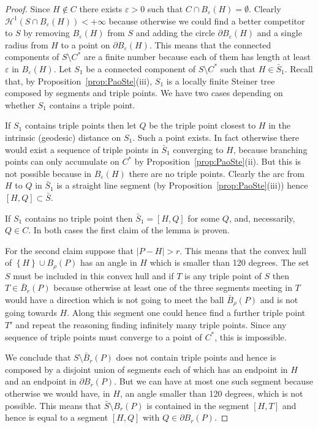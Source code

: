 \documentclass{amsart}
\renewcommand{\H}{\mathcal H}
\newcommand{\eps}{\varepsilon}
\newcommand{\abs}[1]{\left\vert #1 \right\vert}
\newcommand{\ENCLOSE}[1]{\left\{#1\right\}}
\renewcommand{\H}{\mathcal{H}}
\theoremstyle{definition}
\theoremstyle{remark}
\begin{document}
\begin{proof}
  Since $H\not \in C$ there exists $\eps>0$ such that $C\cap B_\eps(H)=\emptyset$. 
  Clearly $\H^1(S\cap B_\eps(H))<+\infty$ because otherwise we could find a better competitor
  to $S$ by removing $B_\eps(H)$ from $S$ and adding the circle $\partial B_\eps(H)$ and 
  a single radius from $H$ to a point on $\partial B_\eps(H)$.
  This means that the connected components of $S\setminus C^*$
  are a finite number because each of them has length at least $\eps$ in $B_\eps(H)$.
  Let $S_1$ be a connected component of $S\setminus C^*$ such that 
  $H\in \bar S_1$.
  Recall that, by Proposition~\ref{prop:PaoSte}(iii), $S_1$ is a locally finite Steiner tree 
  composed by segments and triple points.
  We have two cases depending on whether $S_1$ contains a triple point.
  
  If $S_1$ contains triple points
  then let $Q$ be the triple point closest to $H$
  in the intrinsic (geodesic) distance on $S_1$.
  Such a point exists. 
  In fact otherwise there would exist a sequence of 
  triple points in $\bar S_1$ converging to $H$,
  because branching points can only accumulate on $C^*$ 
  by Proposition~\ref{prop:PaoSte}(ii).
  But this is not possible because in $B_\eps(H)$ there are no triple points.
  Clearly the arc from $H$ to $Q$ in $\bar S_1$ is a straight line segment 
  (by Proposition~\ref{prop:PaoSte}(iii)) hence $[H,Q]\subset \bar S$.

  If $S_1$ contains no triple point then $\bar S_1 =[H,Q]$ for some $Q$, 
  and, necessarily, $Q\in C$. 
  In both cases the first claim of the lemma is proven.

  For the second claim suppose that $\abs{P-H}> r$. 
  This means that the convex hull of $\ENCLOSE{H}\cup B_\rho(P)$ has an angle in 
  $H$ which is smaller than 120 degrees.
  The set $S$ must be included in this convex hull  
  and if $T$ is any triple point of $S$ then $T\in \bar B_r(P)$ because 
  otherwise at least one of the three segments meeting in $T$ would have a direction 
  which is not going to meet the ball $\bar B_\rho(P)$ and is not going towards 
  $H$. Along this segment one could hence find a further triple point $T'$ and repeat 
  the reasoning finding infinitely many triple points. 
  Since any sequence of triple points must converge to a point 
  of $C^*$, this is impossible.

  We conclude that $S\setminus \bar B_r(P)$ does not contain triple points and 
  hence is composed by a disjoint union of segments each of which has an endpoint in $H$
  and an endpoint in $\partial B_r(P)$. 
  But we can have at most one such segment because otherwise we would have, in $H$, an angle 
  smaller than 120 degrees, which is not possible.
  This means that $\bar S \setminus B_r(P)$ is contained in the segment $[H,T]$ and hence 
  is equal to a segment $[H,Q]$ with $Q \in \partial B_r(P)$.
\end{proof}
\end{document}
